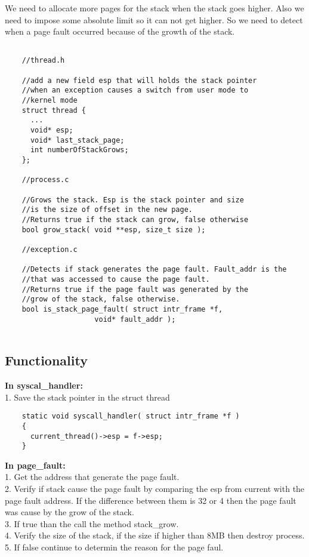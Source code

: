 We need to allocate more pages for the stack when the stack goes higher. Also we need to impose some absolute limit so it can not get higher. So we need to detect when a page fault occurred because of the growth of the stack. 

\begin{lstlisting} 

	//thread.h

	//add a new field esp that will holds the stack pointer
	//when an exception causes a switch from user mode to
	//kernel mode
	struct thread {
	  ...
	  void* esp;
	  void* last_stack_page;
	  int numberOfStackGrows;
	};

	//process.c

	//Grows the stack. Esp is the stack pointer and size
	//is the size of offset in the new page.
	//Returns true if the stack can grow, false otherwise
	bool grow_stack( void **esp, size_t size );

	//exception.c

	//Detects if stack generates the page fault. Fault_addr is the 
	//that was accessed to cause the page fault.
	//Returns true if the page fault was generated by the
	//grow of the stack, false otherwise.
	bool is_stack_page_fault( struct intr_frame *f, 
					 void* fault_addr ); 
	
\end{lstlisting}


\subsection{Functionality}
 
\textbf{In syscal\_handler:}
	  \\1. Save the stack pointer in the struct thread

\begin{lstlisting}
	static void syscall_handler( struct intr_frame *f )
	{
	  current_thread()->esp = f->esp;
	}
\end{lstlisting}


\textbf{In page\_fault:}
	  \\1. Get the address that generate the page fault.
	  \\2. Verify if stack cause the page fault by comparing the esp from current with the page fault address. If the difference between them is 32 or 4 then the page fault was cause by the grow of the stack.
	  \\3. If true than the call the method stack\_grow.
	  \\4. Verify the size of the stack, if the size if higher than 8MB then destroy process.
	  \\5. If false continue to determin the reason for the page faul.

